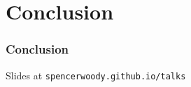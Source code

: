 
\section{Conclusion}


  

  


\begin{frame}
  \frametitle{Conclusion}
  
  Slides at \textcolor{dodgerblue3}{\texttt{spencerwoody.github.io/talks}}
  
\end{frame}

